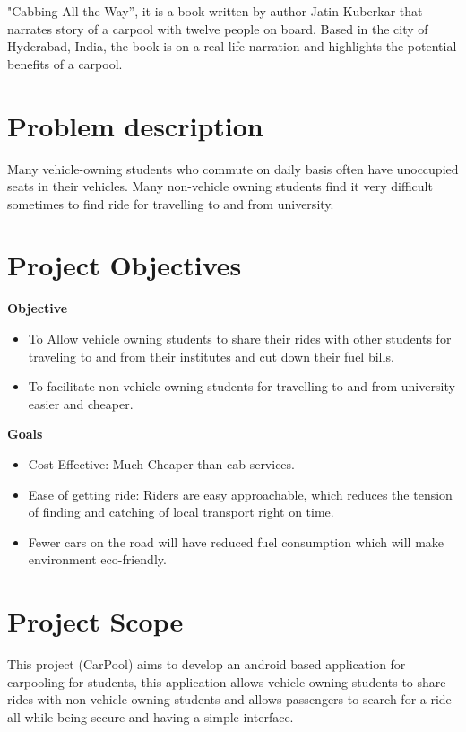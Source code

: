 "Cabbing All the Way”, it is a book written by author Jatin Kuberkar that narrates story of a carpool with twelve people on board. Based in the city of Hyderabad, India, the book is on a real-life narration and highlights the potential beneﬁts of a carpool.

\section{Problem description}
Many vehicle-owning students who commute on daily basis often have unoccupied seats in their vehicles. Many non-vehicle owning students find it very difficult sometimes to find ride for travelling to and from university.

\section{Project Objectives}
\textbf{Objective}
\begin{itemize}

\item To Allow vehicle owning students to share their rides with other students for traveling to and from their institutes and cut down their fuel bills.

\item To facilitate non-vehicle owning students for travelling to and from university easier and cheaper.

\end{itemize}
\textbf{Goals}
\begin{itemize}

\item Cost Effective: Much Cheaper than cab services.
\item Ease of getting ride: Riders are easy approachable, which reduces the tension of finding and catching of local transport right on time.
\item Fewer cars on the road will have reduced fuel consumption which will make environment eco-friendly.
\end{itemize}

\section{Project Scope}
This project (CarPool) aims to develop an android based application for carpooling for students, this application allows vehicle owning students to share rides with non-vehicle owning students and allows passengers to search for a ride all while being secure and having a simple interface.\\

